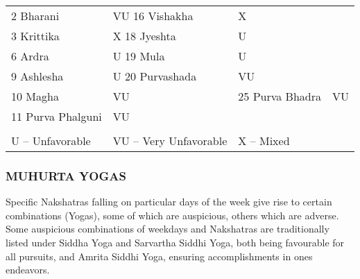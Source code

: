  

 
\begin{center}
\begin{tabular}{ l l l l}
2  Bharani                  &VU                  16  Vishakha                   &X                                 \\

3  Krittika                    & X                  18  Jyeshta                   &U                                 \\

6  Ardra                       &U                  19  Mula                       & U                                 \\

9  Ashlesha                &U                  20  Purvashada           &VU                                 \\

10  Magha                    &VU                 &25  Purva Bhadra       &VU                                 \\
11  Purva Phalguni      &VU&&                                 \\

 & &  \\

  U  –  Unfavorable           &   VU  –  Very Unfavorable               & X  –  Mixed                                 \\
   \end{tabular}
\end{center}

 

\subsubsection{MUHURTA YOGAS}
 

Specific Nakshatras falling on particular days of the week give rise to certain combinations (Yogas), some of which are auspicious, others which are adverse. Some auspicious combinations of weekdays and Nakshatras are traditionally listed under Siddha Yoga and Sarvartha Siddhi Yoga, both being favourable for all pursuits, and Amrita Siddhi Yoga, ensuring accomplishments in ones endeavors.

               


